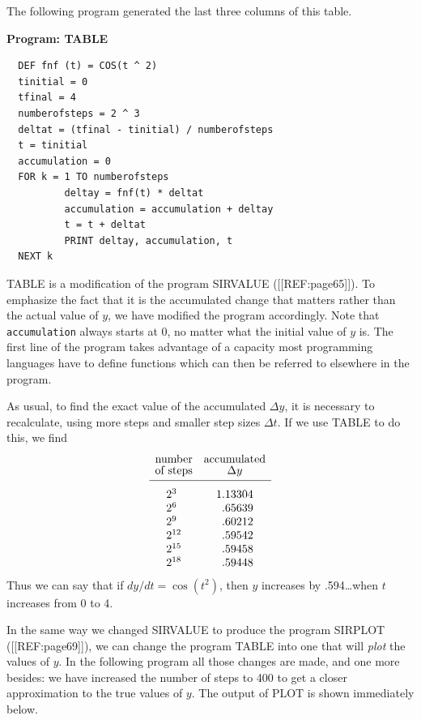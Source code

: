 The following program generated the last three columns of this
table.
\begin{center}
        {\bf Program: TABLE}\\
        \end{center}
\begin{verbatim}
  DEF fnf (t) = COS(t ^ 2)
  tinitial = 0
  tfinal = 4
  numberofsteps = 2 ^ 3
  deltat = (tfinal - tinitial) / numberofsteps
  t = tinitial
  accumulation = 0
  FOR k = 1 TO numberofsteps
          deltay = fnf(t) * deltat
          accumulation = accumulation + deltay
          t = t + deltat
          PRINT deltay, accumulation, t
  NEXT k
\end{verbatim}
TABLE is a modification of the program SIRVALUE ([[REF:page65]]).  To
emphasize the fact that it is the accumulated change that matters
rather than the actual value of $y$, we have modified the program
accordingly.  Note that {\tt accumulation} always starts at 0, no
matter what the initial value of $y$ is.  The first line of the
program takes advantage of a capacity most programming languages have
to define functions which can then be referred to elsewhere in the
program.

As usual, to find the exact value of the accumulated $\Delta y$, it is
necessary to recalculate, using more steps and smaller step sizes
$\Delta t$.  If we use TABLE to do this, we find
        \[
\begin{array}{cc}
        \mbox{number} & \mbox{accumulated} \\[-2pt]
        \mbox{of steps} & \Delta y \\[2pt] \hline
        \rule{0pt}{15pt} 2^{3\hphantom{0}} \rule{0pt}{15pt} 
                & 1.13304 \\
        2^{6\hphantom{0}} & \hphantom{0}.65639 \\
        2^{9\hphantom{0}} & \hphantom{0}.60212 \\
        2^{12} & \hphantom{0}.59542 \\
        2^{15} & \hphantom{0}.59458 \\
        2^{18} & \hphantom{0}.59448 
        \end{array}
\] 
Thus we can say that if $dy/dt = \cos(t^2)$, then $y$ increases by
.594\ldots when $t$ increases from 0 to 4.

In the same way we changed SIRVALUE to produce the program SIRPLOT
([[REF:page69]]), we can change the program TABLE into one that will {\em
  plot\/} the values of $y$.  In the following program all those
changes are made, and one more besides: we have increased the number
of steps to 400 to get a closer approximation to the true values of
$y$. The output of PLOT is shown immediately
below.

